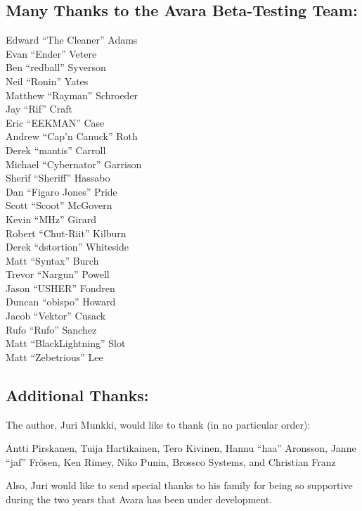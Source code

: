 \documentclass{article}
\begin{document}
\subsection{Many Thanks to the Avara Beta-Testing Team:}
Edward ``The Cleaner'' Adams\\
Evan ``Ender'' Vetere\\
Ben ``redball'' Syverson\\
Neil ``Ronin'' Yates\\
Matthew ``Rayman'' Schroeder\\
Jay ``Rif'' Craft\\
Eric ``EEKMAN'' Case\\
Andrew ``Cap'n Canuck'' Roth\\
Derek ``mantis'' Carroll\\
Michael ``Cybernator'' Garrison\\
Sherif ``Sheriff'' Hassabo\\
Dan ``Figaro Jones'' Pride\\
Scott ``Scoot'' McGovern\\
Kevin ``MHz'' Girard\\
Robert ``Chut-Riit'' Kilburn\\
Derek ``dstortion'' Whiteside\\
Matt ``Syntax'' Burch\\
Trevor ``Nargun'' Powell\\
Jason ``USHER'' Fondren\\
Duncan ``obispo'' Howard\\
Jacob ``Vektor'' Cusack\\
Rufo ``Rufo'' Sanchez\\
Matt ``BlackLightning'' Slot\\
Matt ``Zebetrious'' Lee

\subsection{Additional Thanks:}
The author, Juri Munkki, would like to thank (in no particular order):

Antti Pirskanen, Tuija Hartikainen, Tero Kivinen, Hannu ``haa'' Aronsson, Janne ``jaf'' Frösen, Ken Rimey, Niko Punin, Brossco Systems, and Christian Franz

Also, Juri would like to send special thanks to his family for being so supportive during the two years that Avara has been under development.
\end{document}
